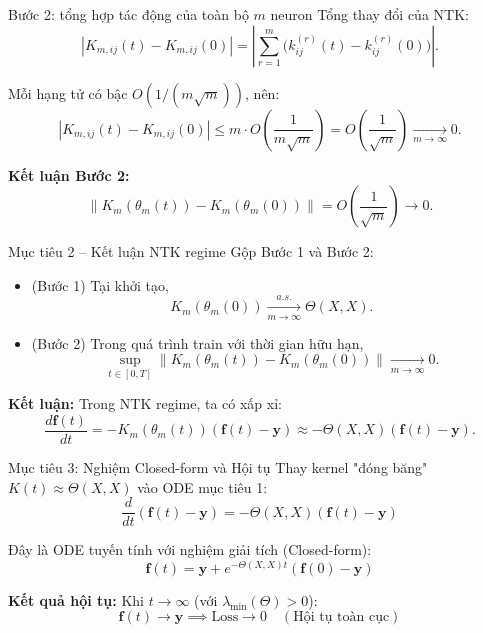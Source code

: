 \begin{frame}{Bước 2: tổng hợp tác động của toàn bộ $m$ neuron}
Tổng thay đổi của NTK:
\[
  |K_{m,ij}(t) - K_{m,ij}(0)|
  = \left|\sum_{r=1}^m \big(k_{ij}^{(r)}(t) - k_{ij}^{(r)}(0)\big)\right|.
\]

Mỗi hạng tử có bậc $O(1/(m\sqrt{m}))$, nên:
\[
  |K_{m,ij}(t) - K_{m,ij}(0)|
  \le
  m \cdot O\!\left(\frac{1}{m\sqrt{m}}\right)
  = O\!\left(\frac{1}{\sqrt{m}}\right)
  \xrightarrow[m\to\infty]{}
  0.
\]

\textbf{Kết luận Bước 2:}
\[
  \|K_m(\theta_m(t)) - K_m(\theta_m(0))\|
  = O\!\left(\frac{1}{\sqrt{m}}\right)
  \to 0.
\]
\end{frame}

\begin{frame}{Mục tiêu 2 – Kết luận NTK regime}
  Gộp Bước 1 và Bước 2:
  \begin{itemize}
    \item (Bước 1) Tại khởi tạo,
      \[
        K_m(\theta_m(0)) \xrightarrow[m\to\infty]{a.s.} \Theta(X,X).
      \]
    \item (Bước 2) Trong quá trình train với thời gian hữu hạn,
      \[
        \sup_{t\in[0,T]}
        \|K_m(\theta_m(t)) - K_m(\theta_m(0))\|
        \xrightarrow[m\to\infty]{} 0.
      \]
  \end{itemize}

  \vspace{0.2cm}
  \textbf{Kết luận:} Trong NTK regime, ta có xấp xỉ:
  \[
    \frac{d\mathbf f(t)}{dt}
      = -K_m(\theta_m(t))(\mathbf f(t)-\mathbf y)
      \approx -\Theta(X,X)(\mathbf f(t)-\mathbf y).
  \]
\end{frame}

\begin{frame}{Mục tiêu 3: Nghiệm Closed-form và Hội tụ}
  Thay kernel "đóng băng" $K(t) \approx \Theta(X,X)$ vào ODE mục tiêu 1:
  \[ \frac{d}{dt}(\mathbf{f}(t) - \mathbf{y}) = -\Theta(X,X)(\mathbf{f}(t) - \mathbf{y}) \]
  
  Đây là ODE tuyến tính với nghiệm giải tích (Closed-form):
  \[ \mathbf{f}(t) = \mathbf{y} + e^{-\Theta(X,X)t}(\mathbf{f}(0) - \mathbf{y}) \]
  
  \textbf{Kết quả hội tụ:} Khi $t \to \infty$ (với $\lambda_{\min}(\Theta) > 0$):
  \[ \mathbf{f}(t) \to \mathbf{y} \implies \text{Loss} \to 0 \quad (\text{Hội tụ toàn cục}) \]
\end{frame}


